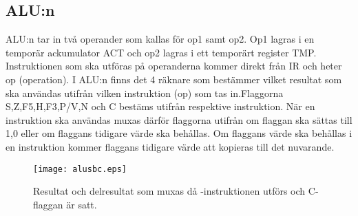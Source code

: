 \documentclass[main.tex]{subfiles}
\begin{document}
\subsection{ALU:n}
 ALU:n tar in två operander som kallas för op1 samt op2. Op1 lagras i en
 temporär ackumulator ACT och op2 lagras i ett temporärt register TMP.
 Instruktionen som ska utföras på operanderna kommer direkt från IR och heter
 op (operation). I ALU:n finns det 4 räknare som bestämmer vilket resultat som
 ska användas utifrån vilken instruktion (op) som tas in.Flaggorna
 S,Z,F5,H,F3,P/V,N och C bestäms utifrån respektive instruktion. När en
 instruktion ska användas muxas därför flaggorna utifrån om flaggan ska sättas
 till 1,0 eller om flaggans tidigare värde ska behållas. Om flaggans värde ska
 behållas i en instruktion kommer flaggans tidigare värde att kopieras till det
 nuvarande.

\begin{figure}[H]
    \center
    \texttt{[image: alusbc.eps]}
    \caption{Resultat och delresultat som muxas då -instruktionen
    utförs och C-flaggan är satt.}
\end{figure}
\end{document}
